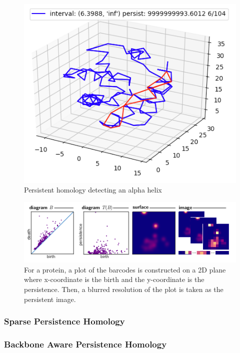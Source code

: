\documentclass[12pt, a4paper, twocolumn, fullpage]{article}
\theoremstyle{plain}
\theoremstyle{definition}
\theoremstyle{remark}
\begin{document}
\begin{figure}
    \includegraphics[width=\linewidth]{img/hom/Simplex2.png}
    \caption{Persistent homology detecting an alpha helix}
    \label{Simplex2}
\end{figure}


\begin{figure}
    \includegraphics[width=\linewidth]{persistenceimages.png}
    \caption{For a protein, a plot of the barcodes is constructed on a 2D plane where x-coordinate is the birth and the y-coordinate is the persistence. Then, a blurred resolution of the plot is taken as the persistent image.}
    \label{persistenceimages}
\end{figure}
\subsubsection{ Sparse Persistence Homology}

\subsubsection{ Backbone Aware Persistence Homology}
\end{document}

